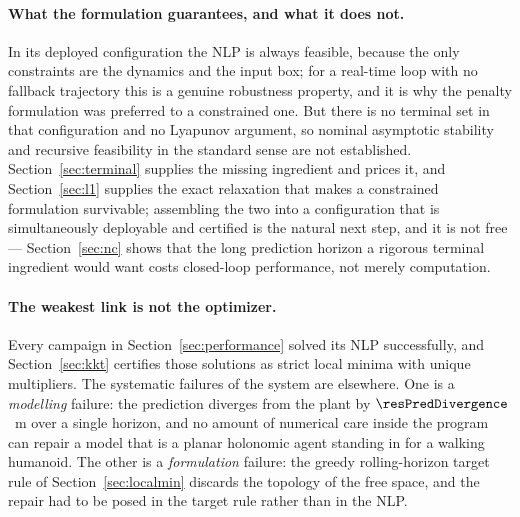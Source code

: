 \documentclass[11pt,a4paper]{article}
\begin{document}
\paragraph{What the formulation guarantees, and what it does not.} In its deployed configuration the NLP is
always feasible, because the only constraints are the dynamics and the input box; for a real-time loop with
no fallback trajectory this is a genuine robustness property, and it is why the penalty formulation was
preferred to a constrained one. But there is no terminal set in that configuration and no Lyapunov argument,
so nominal asymptotic stability and recursive feasibility in the standard sense
\cite{mayne2000constrained} are not established. Section~\ref{sec:terminal} supplies the missing ingredient
and prices it, and Section~\ref{sec:l1} supplies the exact relaxation that makes a constrained formulation
survivable; assembling the two into a configuration that is simultaneously deployable and certified is the
natural next step, and it is not free --- Section~\ref{sec:nc} shows that the long prediction horizon a
rigorous terminal ingredient would want costs closed-loop performance, not merely computation.

\paragraph{The weakest link is not the optimizer.} Every campaign in Section~\ref{sec:performance} solved its
NLP successfully, and Section~\ref{sec:kkt} certifies those solutions as strict local minima with unique
multipliers. The systematic failures of the system are elsewhere. One is a \emph{modelling} failure: the
prediction diverges from the plant by $\resPredDivergence$~m over a single horizon, and no amount of
numerical care inside the program can repair a model that is a planar holonomic agent standing in for a
walking humanoid. The other is a \emph{formulation} failure: the greedy rolling-horizon target rule of
Section~\ref{sec:localmin} discards the topology of the free space, and the repair had to be posed in the
target rule rather than in the NLP.
\end{document}
